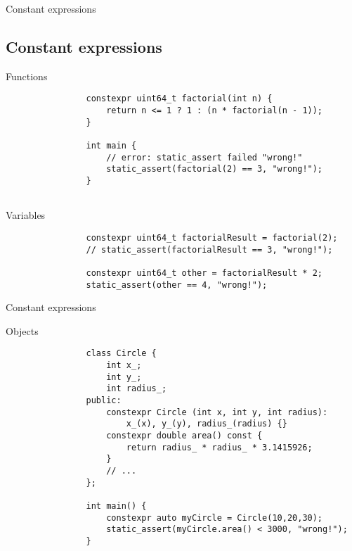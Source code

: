 \documentclass{beamer}
\newcommand{\normalSizeItem}[1] {
  \normalsize{\item #1}
}
\newcommand{\smallCite}[1]{
	\begin{small}
		\cite{#1}	
	\end{small}
}
\begin{document}
		\begin{frame}[fragile]{Constant expressions \ttfamily{(constexpr)\smallCite{constexpr}}}	
			\subsection{Constant expressions }		
			\begin{itemize}
			
				\normalSizeItem { Functions }
				\begin{lstlisting}
				constexpr uint64_t factorial(int n) {
					return n <= 1 ? 1 : (n * factorial(n - 1));
				}
				
				int main {
					// error: static_assert failed "wrong!"
					static_assert(factorial(2) == 3, "wrong!");
				}
				
				\end{lstlisting}
				
				\normalSizeItem { Variables }
				\begin{lstlisting}
				constexpr uint64_t factorialResult = factorial(2);
				// static_assert(factorialResult == 3, "wrong!");
			
				constexpr uint64_t other = factorialResult * 2;
				static_assert(other == 4, "wrong!");
				\end{lstlisting}
				
			\end{itemize}
		\end{frame}
		
		\begin{frame}[fragile]{Constant expressions }		
			\begin{itemize}
			
				\normalSizeItem { Objects }
				\begin{lstlisting}
				class Circle {
					int x_;
					int y_;
					int radius_;
				public:
					constexpr Circle (int x, int y, int radius): 
						x_(x), y_(y), radius_(radius) {}
					constexpr double area() const {
						return radius_ * radius_ * 3.1415926;
					}
					// ...
				};
				
				int main() {
					constexpr auto myCircle = Circle(10,20,30);
					static_assert(myCircle.area() < 3000, "wrong!");
				}
				
				\end{lstlisting}
			\end{itemize}
		\end{frame}
		
\end{document}
